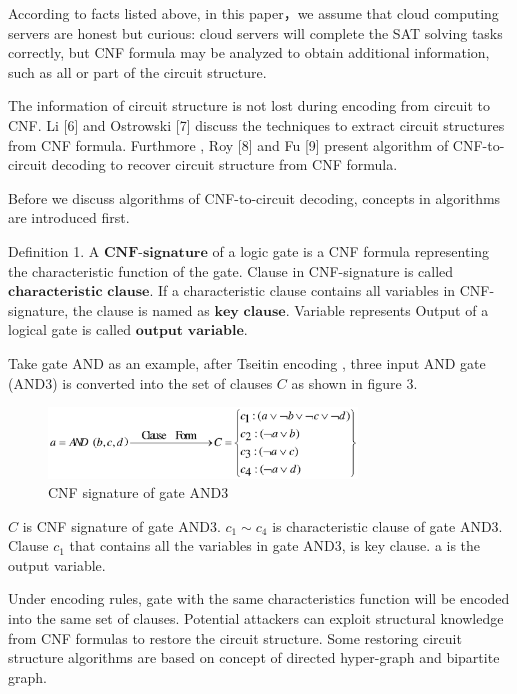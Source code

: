 \documentclass[runningheads,a4paper]{llncs}
\begin{document}
According to facts listed above, in this paper，we assume that cloud computing servers are honest but curious:
cloud servers will complete the SAT solving tasks correctly, but CNF formula may be analyzed to obtain additional information, such as all or part of the circuit structure.

The information of circuit structure is not lost during encoding from circuit to CNF. Li [6] and Ostrowski [7] discuss the techniques to extract circuit structures from CNF formula.
Furthmore , Roy [8] and Fu [9]  present algorithm of CNF-to-circuit decoding to recover circuit structure from CNF formula.

Before we discuss algorithms of CNF-to-circuit decoding, concepts in algorithms are introduced first.  

\noindent \newline Definition 1. A $\mathbf{CNF}$-$\mathbf{signature}$ of a logic gate is a CNF formula representing the characteristic function of the gate.
Clause in CNF-signature is called $\mathbf{characteristic}$ $\mathbf{clause}$.
If a characteristic clause contains all variables in CNF-signature, the clause is named as $\mathbf{key}$ $\mathbf{clause}$.
Variable represents Output of a logical gate is called $\mathbf{output}$ $\mathbf{variable}$.
\setlength{\parindent}{2em} \newline

Take gate AND as an example, after Tseitin encoding , three input AND gate (AND3) is converted into the set of clauses $C$ as shown in figure 3.
\begin{figure}
\centering
\includegraphics[width=8.2cm]{a3}
\caption{CNF signature of gate AND3 }
\end{figure}
$C$ is CNF signature of gate AND3. $c_1 \sim c_4$ is characteristic clause of gate AND3. 
Clause $c_1$ that contains all the variables in gate AND3, is key clause. a is the output variable.

Under encoding rules, gate with the same characteristics function will be encoded into the same set of clauses. 
Potential attackers can exploit structural knowledge from CNF formulas to restore the circuit structure. 
Some restoring circuit structure algorithms are based on concept of directed hyper-graph and bipartite graph.	
\end{document}
